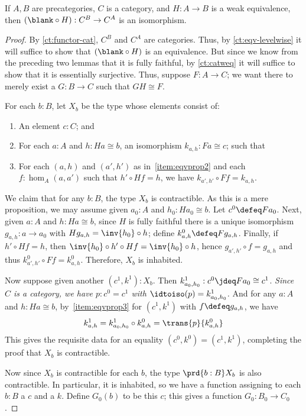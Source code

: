 \begin{thm}\label{ct:cat-weq-eq}
  If $A,B$ are precategories, $C$ is a category, and $H:A\to B$ is a weak equivalence, then $(\blank\circ H):C^B \to C^A$ is an isomorphism.
\end{thm}
\begin{proof}
  By \cref{ct:functor-cat}, $C^B$ and $C^A$ are categories.
  Thus, by \cref{ct:eqv-levelwise} it will suffice to show that $(\blank\circ H)$ is an equivalence.
  But since we know from the preceding two lemmas that it is fully faithful, by \cref{ct:catweq} it will suffice to show that it is essentially surjective.
  Thus, suppose $F:A\to C$; we want there to merely exist a $G:B\to C$ such that $GH\cong F$.

  For each $b:B$, let $X_b$ be the type whose elements consist of:
  \begin{enumerate}
  \item An element $c:C$; and
  \item For each $a:A$ and $h:Ha\cong b$, an isomorphism $k_{a,h}:Fa\cong c$; such that\label{item:eqvprop2}
  \item For each $(a,h)$ and $(a',h')$ as in~\ref{item:eqvprop2} and each $f:\hom_A(a,a')$ such that $h'\circ Hf = h$, we have $k_{a',h'}\circ Ff = k_{a,h}$.\label{item:eqvprop3}
  \end{enumerate}
  We claim that for any $b:B$, the type $X_b$ is contractible.
  As this is a mere proposition, we may assume given $a_0:A$ and $h_0:Ha_0 \cong b$.
  Let $c^0\defeq Fa_0$.
  Next, given $a:A$ and $h:Ha\cong b$, since $H$ is fully faithful there is a unique isomorphism $g_{a,h}:a\to a_0$ with $Hg_{a,h} = \inv{h_0}\circ h$; define $k^0_{a,h} \defeq Fg_{a,h}$.
  Finally, if $h'\circ Hf = h$, then $\inv{h_0}\circ h'\circ Hf = \inv{h_0}\circ h$, hence $g_{a',h'} \circ f = g_{a,h}$ and thus $k^0_{a',h'}\circ Ff = k^0_{a,h}$.
  Therefore, $X_b$ is inhabited.

  Now suppose given another $(c^1,k^1): X_b$.
  Then $k^1_{a_0,h_0}:c^0 \jdeq Fa_0 \cong c^1$.
  \emph{Since $C$ is a category, we have $p:c^0=c^1$ with $\idtoiso(p) = k^1_{a_0,h_0}$.}
  And for any $a:A$ and $h:Ha\cong b$, by~\ref{item:eqvprop3} for $(c^1,k^1)$ with $f\defeq g_{a,h}$, we have
  \[k^1_{a,h} = k^1_{a_0,h_0} \circ k^0_{a,h} = \trans{p}{k^0_{a,h}}\]
  This gives the requisite data for an equality $(c^0,k^0)=(c^1,k^1)$, completing the proof that $X_b$ is contractible.

  Now since $X_b$ is contractible for each $b$, the type $\prd{b:B} X_b$ is also contractible.
  In particular, it is inhabited, so we have a function assigning to each $b:B$ a $c$ and a $k$.
  Define $G_0(b)$ to be this $c$; this gives a function $G_0 :B_0 \to C_0$.


\end{proof}
